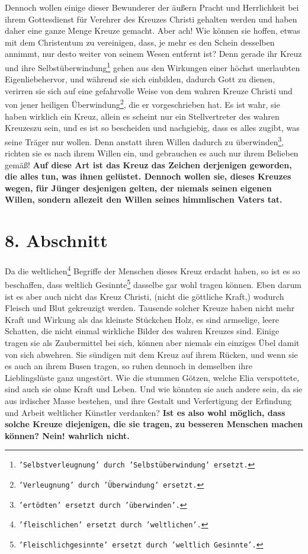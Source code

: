  Dennoch wollen einige dieser Bewunderer der äußern
Pracht und Herrlichkeit bei
ihrem Gottesdienst für Verehrer des Kreuzes Christi gehalten werden und haben
daher eine ganze Menge Kreuze gemacht. Aber ach! Wie können sie hoffen, etwas
mit dem Christentum zu vereinigen, dass, je mehr es den Schein desselben
annimmt, nur desto weiter von seinem Wesen entfernt ist? Denn gerade ihr Kreuz
und ihre Selbstüberwindung\footnote{\texttt{'Selbstverleugnung' durch
'Selbstüberwindung' ersetzt.}}
gehen aus den Wirkungen einer höchst unerlaubten
Eigenliebehervor, und während sie sich einbilden, dadurch
Gott zu dienen,
verirren sie sich auf eine gefahrvolle Weise von dem wahren Kreuze Christi und
von jener heiligen Überwindung\footnote{\texttt{'Verleugnung' durch 'Überwindung'
ersetzt.}}, die er vorgeschrieben hat. Es ist wahr, sie
haben wirklich ein Kreuz, allein es scheint nur ein Stellvertreter des wahren
Kreuzeszu sein, und es ist so bescheiden und
nachgiebig, dass es alles zugibt,
was seine Träger nur wollen. Denn anstatt ihren Willen dadurch zu
überwinden\footnote{\texttt{'ertödten' ersetzt durch 'überwinden'.}},
richten sie es nach ihrem Willen ein, und gebrauchen es auch nur ihrem Belieben
gemäß! \label{ref:05_07_kreuz}
\textbf{Auf diese Art ist das Kreuz das Zeichen derjenigen geworden, die
alles
tun, was ihnen gelüstet. Dennoch wollen sie, dieses Kreuzes wegen, für Jünger
desjenigen gelten, der niemals seinen eigenen Willen, sondern allezeit den
Willen seines himmlischen Vaters tat.}

\section{8. Abschnitt} \label{kap5_ab8}

 Da die weltlichen\footnote{\texttt{'fleischlichen'
ersetzt durch 'weltlichen'.}} Begriffe der Menschen dieses Kreuz erdacht haben,
so ist es so beschaffen, dass weltlich
Gesinnte\footnote{\texttt{'Fleischlichgesinnte' ersetzt
durch 'weltlich Gesinnte'.}} dasselbe gar wohl tragen können. Eben
darum ist es aber auch nicht das Kreuz Christi, (nicht die göttliche Kraft,)
wodurch Fleisch und Blut gekreuzigt werden. Tausende solcher Kreuze haben nicht
mehr Kraft und Wirkung als das kleinste Stückchen Holz, es sind armselige,
leere Schatten, die nicht einmal wirkliche Bilder des wahren Kreuzes sind.
Einige tragen sie als Zaubermittel bei sich, können aber niemals ein einziges
Übel damit von sich abwehren. Sie sündigen mit dem Kreuz auf ihrem Rücken, und
wenn sie es auch an ihrem Busen tragen, so ruhen dennoch in demselben ihre
Lieblingslüste ganz ungestört. Wie die stummen Götzen, welche Elia verspottete,
sind auch sie ohne Kraft und Leben. Und wie könnten sie auch andere sein, da sie
aus irdischer Masse bestehen, und ihre Gestalt und Verfertigung der Erfindung
und Arbeit weltlicher Künstler verdanken? \label{ref:05_08_kreuz}
\textbf{Ist es also wohl möglich, dass solche
Kreuze diejenigen, die sie tragen, zu besseren Menschen machen können? Nein!
wahrlich nicht.}

